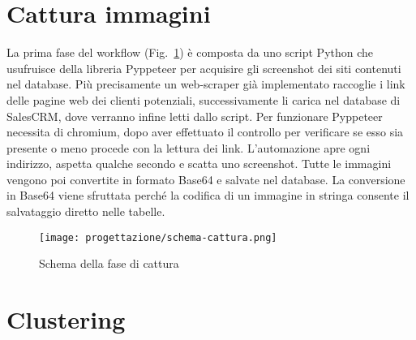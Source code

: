 \section{Cattura immagini}
La prima fase del workflow (Fig.~\ref{fig:schema-cattura}) è composta da uno script Python che usufruisce della libreria Pyppeteer per acquisire gli screenshot dei siti contenuti nel database.
Più precisamente un web-scraper già implementato raccoglie i link delle pagine web dei clienti potenziali, successivamente li carica nel database di SalesCRM, dove verranno infine letti dallo script.
Per funzionare Pyppeteer necessita di chromium, dopo aver effettuato il controllo per verificare se esso sia presente o meno procede con la lettura dei link. 
L'automazione apre ogni indirizzo, aspetta qualche secondo e scatta uno screenshot. 
Tutte le immagini vengono poi convertite in formato Base64 e salvate nel database.
La conversione in Base64 viene sfruttata perché la codifica di un immagine in stringa consente il salvataggio diretto nelle tabelle.

\begin{figure}[!h] 
  \centering 
  \texttt{[image: progettazione/schema-cattura.png]} 
  \caption{Schema della fase di cattura}
  \label{fig:schema-cattura}
\end{figure}

\newpage

\section{Clustering}
